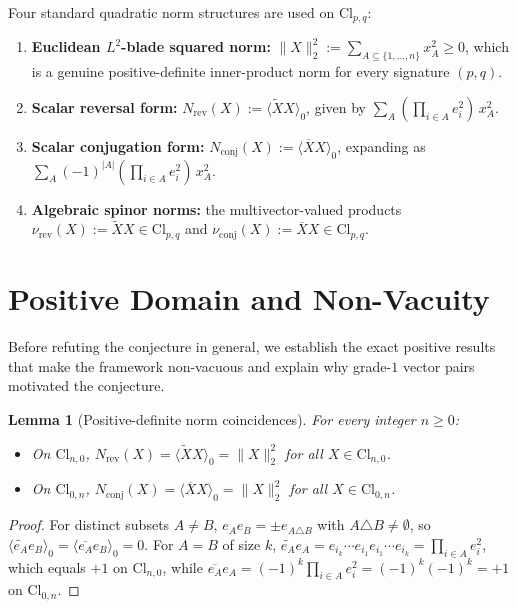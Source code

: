 \documentclass[11pt]{article}
\newtheorem{lemma}[theorem]{Lemma}
\theoremstyle{definition}
\newcommand{\Cl}{\mathrm{Cl}}
\newcommand{\Nrev}{N_{\mathrm{rev}}}
\newcommand{\Nconj}{N_{\mathrm{conj}}}
\begin{document}
Four standard quadratic norm structures are used on $\Cl_{p,q}$:
\begin{enumerate}
  \item \textbf{Euclidean $L^2$-blade squared norm:} $\|X\|_2^2 := \sum_{A\subseteq\{1,\dots,n\}} x_A^2 \ge 0$, which is a genuine positive-definite inner-product norm for every signature $(p,q)$.
  \item \textbf{Scalar reversal form:} $\Nrev(X) := \langle\widetilde{X}X\rangle_0$, given by $\sum_A (\prod_{i\in A} e_i^2)\,x_A^2$.
  \item \textbf{Scalar conjugation form:} $\Nconj(X) := \langle\overline{X}X\rangle_0$, expanding as $\sum_A (-1)^{|A|}(\prod_{i\in A} e_i^2)\,x_A^2$.
  \item \textbf{Algebraic spinor norms:} the multivector-valued products $\nu_{\mathrm{rev}}(X):=\widetilde{X}X\in\Cl_{p,q}$ and $\nu_{\mathrm{conj}}(X):=\overline{X}X\in\Cl_{p,q}$.
\end{enumerate}

\section{Positive Domain and Non-Vacuity}

Before refuting the conjecture in general, we establish the exact positive results that make the framework non-vacuous and explain why grade-$1$ vector pairs motivated the conjecture.

\begin{lemma}[Positive-definite norm coincidences]\label{lem:coincidence}
For every integer $n\ge 0$:
\begin{itemize}
  \item[(a)] On $\Cl_{n,0}$, $\Nrev(X)=\langle\widetilde{X}X\rangle_0=\|X\|_2^2$ for all $X\in\Cl_{n,0}$.
  \item[(b)] On $\Cl_{0,n}$, $\Nconj(X)=\langle\overline{X}X\rangle_0=\|X\|_2^2$ for all $X\in\Cl_{0,n}$.
\end{itemize}
\end{lemma}
\begin{proof}
For distinct subsets $A\ne B$, $e_A e_B=\pm e_{A\triangle B}$ with $A\triangle B\ne\emptyset$, so $\langle\widetilde{e_A}e_B\rangle_0=\langle\overline{e_A}e_B\rangle_0=0$. For $A=B$ of size $k$, $\widetilde{e_A}e_A=e_{i_k}\cdots e_{i_1}e_{i_1}\cdots e_{i_k}=\prod_{i\in A}e_i^2$, which equals $+1$ on $\Cl_{n,0}$, while $\overline{e_A}e_A=(-1)^k\prod_{i\in A}e_i^2=(-1)^k(-1)^k=+1$ on $\Cl_{0,n}$.
\end{proof}
\end{document}
